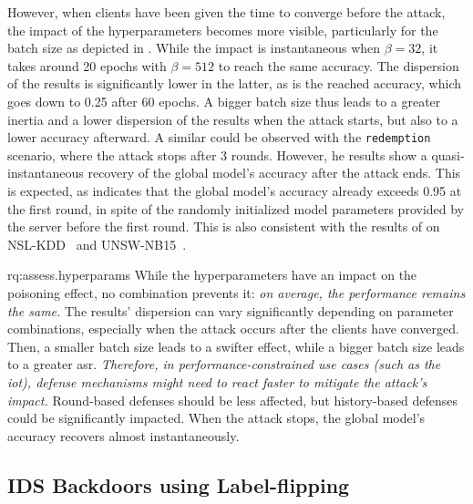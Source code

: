 However, when clients have been given the time to converge before the attack, the impact of the hyperparameters becomes more visible, particularly for the batch size as depicted in .
While the impact is instantaneous when $\beta=32$, it takes around 20 epochs with $\beta=512$ to reach the same accuracy.
The dispersion of the results is significantly lower in the latter, as is the reached accuracy, which goes down to 0.25 after 60 epochs.
A bigger batch size thus leads to a greater inertia and a lower dispersion of the results when the attack starts, but also to a lower accuracy afterward.
A similar could be observed with the \texttt{redemption} scenario, where the attack stops after 3 rounds.
However, he results show a quasi-instantaneous recovery of the global model's accuracy after the attack ends.
This is expected, as  indicates that the global model's accuracy already exceeds 0.95 at the first round, in spite of the randomly initialized model parameters provided by the server before the first round.
This is also consistent with the results of \textcite{zhang_Evaluationdatapoisoning_2022} on NSL-KDD~\cite{tavallaee_detailedanalysisKDD_2009} and UNSW-NB15~\cite{moustafa_UNSWNB15comprehensivedata_2015}.


\begin{answerbox}{rq:assess.hyperparams}
  While the hyperparameters have an impact on the poisoning effect, no combination prevents it: \emph{on average, the performance remains the same.}
  The results' dispersion can vary significantly depending on parameter combinations, especially when the attack occurs after the clients have converged.
  Then, a smaller batch size leads to a swifter effect, while a bigger batch size leads to a greater \gls{asr}.
  \emph{Therefore, in performance-constrained use cases (such as the \gls{iot}), defense mechanisms might need to react faster to mitigate the attack's impact.}
  Round-based defenses should be less affected, but history-based defenses could be significantly impacted.
  When the attack stops, the global model's accuracy recovers almost instantaneously.
\end{answerbox}




\subsection{IDS Backdoors using Label-flipping\label{sec:assess.results.backdoors}}

